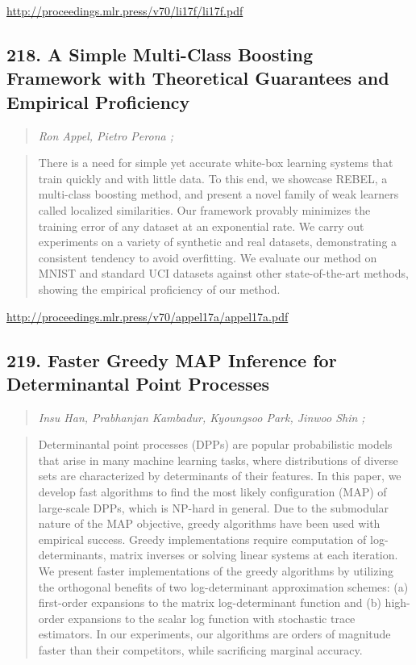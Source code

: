 \documentclass{article}
\begin{document}
\href{http://proceedings.mlr.press/v70/li17f/li17f.pdf}{http://proceedings.mlr.press/v70/li17f/li17f.pdf}

\subsection{218. A Simple Multi-Class Boosting Framework with Theoretical Guarantees and Empirical Proficiency}

\begin{quote}
\footnotesize{\textit{Ron Appel, Pietro Perona ;}}

\end{quote}

\begin{quote}
    There is a need for simple yet accurate white-box learning systems that train quickly and with little data. To this end, we showcase REBEL, a multi-class boosting method, and present a novel family of weak learners called localized similarities. Our framework provably minimizes the training error of any dataset at an exponential rate. We carry out experiments on a variety of synthetic and real datasets, demonstrating a consistent tendency to avoid overfitting. We evaluate our method on MNIST and standard UCI datasets against other state-of-the-art methods, showing the empirical proficiency of our method.  
\end{quote}

\href{http://proceedings.mlr.press/v70/appel17a/appel17a.pdf}{http://proceedings.mlr.press/v70/appel17a/appel17a.pdf}

\subsection{219. Faster Greedy MAP Inference for Determinantal Point Processes}

\begin{quote}
\footnotesize{\textit{Insu Han, Prabhanjan Kambadur, Kyoungsoo Park, Jinwoo Shin ;}}

\end{quote}

\begin{quote}
    Determinantal point processes (DPPs) are popular probabilistic models that arise in many machine learning tasks, where distributions of diverse sets are characterized by determinants of their features. In this paper, we develop fast algorithms to find the most likely configuration (MAP) of large-scale DPPs, which is NP-hard in general. Due to the submodular nature of the MAP objective, greedy algorithms have been used with empirical success. Greedy implementations require computation of log-determinants, matrix inverses or solving linear systems at each iteration. We present faster implementations of the greedy algorithms by utilizing the orthogonal benefits of two log-determinant approximation schemes: (a) first-order expansions to the matrix log-determinant function and (b) high-order expansions to the scalar log function with stochastic trace estimators. In our experiments, our algorithms are orders of magnitude faster than their competitors, while sacrificing marginal accuracy.  
\end{quote}
\end{document}
